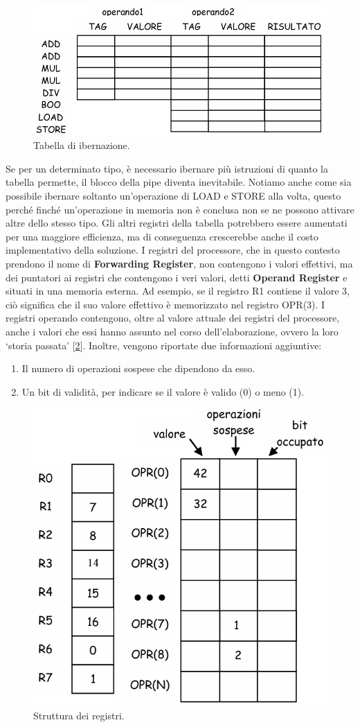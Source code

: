 \begin{figure}[ht]
    \centering
    \includegraphics[width=0.5\linewidth]{img/tabella_ibernazione.png}
    \caption{Tabella di ibernazione.}
    \label{fig:tabella_ibern}
\end{figure}
Se per un determinato tipo, è necessario ibernare più istruzioni di quanto la tabella permette, il blocco della pipe diventa inevitabile. Notiamo anche come sia possibile ibernare soltanto un'operazione di LOAD e STORE alla volta, questo perché  finché un'operazione in memoria non è conclusa non se ne possono attivare altre dello stesso tipo. Gli altri registri della tabella potrebbero essere aumentati per una maggiore efficienza, ma di conseguenza crescerebbe anche il costo implementativo della soluzione. I registri del processore, che in questo contesto prendono il nome di \textbf{Forwarding Register}, non contengono i valori effettivi, ma dei puntatori ai registri che contengono i veri valori, detti \textbf{Operand Register} e situati in una memoria esterna. Ad esempio, se il registro R1 contiene il valore 3, ciò significa che il suo valore effettivo è memorizzato nel registro OPR(3). I registri operando contengono, oltre al valore attuale dei registri del processore, anche i valori che essi hanno assunto nel corso dell'elaborazione, ovvero la loro ‘storia passata’ [\ref{fig:for-op-reg}]. Inoltre, vengono riportate due informazioni aggiuntive:
\begin{enumerate}
    \item Il numero di operazioni sospese che dipendono da esso.
    \item Un bit di validità, per indicare se il valore è valido (0) o meno (1). 
\end{enumerate}
\begin{figure}[ht]
    \centering
    \includegraphics[width=0.4\linewidth]{img/registri_if.png}
    \caption{Struttura dei registri.}
    \label{fig:for-op-reg}
\end{figure}
